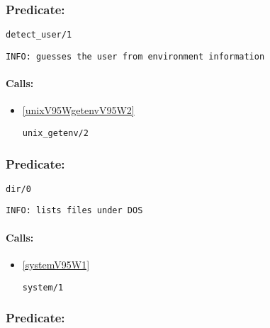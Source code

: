 \subsubsection{Predicate:} \label{detectV95WuserV95W1}

\begin{verbatim}
detect_user/1
\end{verbatim}

{\small \begin{verbatim}
INFO: guesses the user from environment information

\end{verbatim}}
\paragraph{Calls:} 
\begin{itemize}
\item \ref{unixV95WgetenvV95W2} 
\begin{verbatim}
unix_getenv/2
\end{verbatim}

\end{itemize}

\subsubsection{Predicate:} \label{dirV95W0}

\begin{verbatim}
dir/0
\end{verbatim}

{\small \begin{verbatim}
INFO: lists files under DOS

\end{verbatim}}
\paragraph{Calls:} 
\begin{itemize}
\item \ref{systemV95W1} 
\begin{verbatim}
system/1
\end{verbatim}

\end{itemize}

\subsubsection{Predicate:} \label{dir2dirsV95W2}


